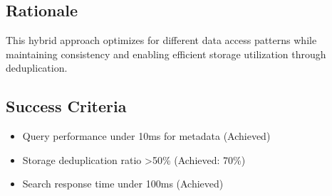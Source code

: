 \subsection*{Rationale}

This hybrid approach optimizes for different data access patterns while maintaining consistency and enabling efficient storage utilization through deduplication.

\subsection*{Success Criteria}

\begin{itemize}
\item Query performance under 10ms for metadata (Achieved)
\item Storage deduplication ratio >50\% (Achieved: 70\%)
\item Search response time under 100ms (Achieved)
\end{itemize}
